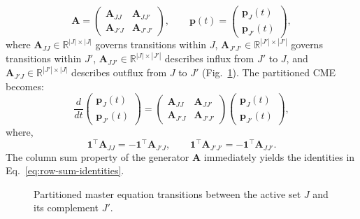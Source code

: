 \documentclass[review,onefignum,onetabnum]{siamart171218}
\begin{document}
\begin{equation}
\label{eq:block-partition}
\mathbf{A}=
\begin{pmatrix}
\mathbf{A}_{JJ} & \mathbf{A}_{JJ'}\\
\mathbf{A}_{J'J} & \mathbf{A}_{J'J'}
\end{pmatrix}, 
\qquad
\boldsymbol{p}(t)=
\begin{pmatrix}
\boldsymbol{p}_J(t)\\
\boldsymbol{p}_{J'}(t)
\end{pmatrix},
\end{equation}
where $\mathbf{A}_{JJ} \in \mathbb{R}^{|J| \times |J|}$ governs transitions within $J$, $\mathbf{A}_{J'J'} \in \mathbb{R}^{|J'| \times |J'|}$ governs transitions within $J'$, $\mathbf{A}_{JJ'} \in \mathbb{R}^{|J| \times |J'|}$ describes influx from $J'$ to $J$, and $\mathbf{A}_{J'J} \in \mathbb{R}^{|J'| \times |J|}$ describes outflux from $J$ to $J'$ (Fig.~\ref{fig:transitions}). The partitioned CME becomes:
\begin{equation}
\label{eq:partitioned-cme}
\frac{d}{dt}
\begin{pmatrix}
\boldsymbol{p}_J(t) \\
\boldsymbol{p}_{J'}(t)
\end{pmatrix}
=
\begin{pmatrix}
\mathbf{A}_{JJ} & \mathbf{A}_{JJ'}\\
\mathbf{A}_{J'J} & \mathbf{A}_{J'J'}
\end{pmatrix}
\begin{pmatrix}
\boldsymbol{p}_J(t) \\
\boldsymbol{p}_{J'}(t)
\end{pmatrix},
\end{equation}
where, 
\begin{equation}
\label{eq:row-sum-identities}
\mathbf{1}^\top \mathbf{A}_{JJ} = -\mathbf{1}^\top \mathbf{A}_{J'J}, \qquad \mathbf{1}^\top \mathbf{A}_{J'J'} = -\mathbf{1}^\top \mathbf{A}_{JJ'}.
\end{equation}
The column sum property of the generator $\mathbf{A}$ immediately yields the identities in Eq.~\eqref{eq:row-sum-identities}.
\begin{figure}[ht!]
    \centering
    \caption{Partitioned master equation transitions between the active set $J$ and its complement $J'$.}
    \label{fig:transitions}
\end{figure}
\end{document}
